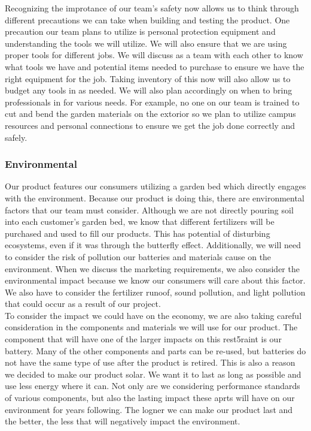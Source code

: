 Recognizing the improtance of our team's safety now allows us to think through different precautions we can take when building and testing the product. One precaution our team plans to utilize is personal protection equipment and understanding the tools we will utilize. We will also ensure that we are using proper tools for different jobs. We will discuss as a team with each other to know what tools we have and potential items needed to purchase to ensure we have the right equipment for the job. Taking inventory of this now will also allow us to budget any tools in as needed. We will also plan accordingly on when to bring professionals in for various needs. For example, no one on our team is trained to cut and bend the garden materials on the extorior so we plan to utilize campus resources and personal connections to ensure we get the job done correctly and safely. \\

\subsubsection{Environmental}
Our product features our consumers utilizing a garden bed which directly engages with the environment. Because our product is doing this, there are environmental factors that our team must consider. Although we are not directly pouring soil into each customer's garden bed, we know that different fertilizers will be purchased and used to fill our products. This has potential of disturbing ecosystems, even if it was through the butterfly effect. Additionally, we will need to consider the risk of pollution our batteries and materials cause on the environment. When we discuss the marketing requirements, we also consider the environmental impact because we know our consumers will care about this factor. We also have to consider the fertilizer runoof, sound pollution, and light pollution that could occur as a result of our project.\\

To consider the impact we could have on the economy, we are also taking careful consideration in the components and materials we will use for our product. The component that will have one of the larger impacts on this rest5raint is our battery. Many of the other components and parts can be re-used, but batteries do not have the same type of use after the product is retired. This is also a reason we decided to make our product solar. We want it to last as long as possible and use less energy where it can. Not only are we considering performance standards of various components, but also the lasting impact these aprts will have on our environment for years following. The logner we can make our product last and the better, the less that will negatively impact the environment. 


